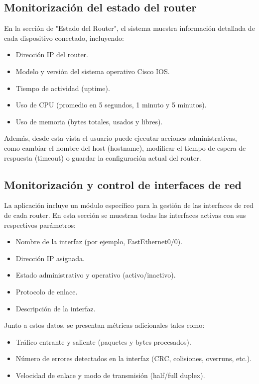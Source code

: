 \subsection*{Monitorización del estado del router}

En la sección de "Estado del Router", el sistema muestra información detallada de cada dispositivo conectado, incluyendo:

\begin{itemize}
    \item Dirección IP del router.
    \item Modelo y versión del sistema operativo Cisco IOS.
    \item Tiempo de actividad (uptime).
    \item Uso de CPU (promedio en 5 segundos, 1 minuto y 5 minutos).
    \item Uso de memoria (bytes totales, usados y libres).
\end{itemize}

Además, desde esta vista el usuario puede ejecutar acciones administrativas, como cambiar el nombre del host (hostname), modificar el tiempo de espera de respuesta (timeout) o guardar la configuración actual del router.

\subsection*{Monitorización y control de interfaces de red}

La aplicación incluye un módulo específico para la gestión de las interfaces de red de cada router. En esta sección se muestran todas las interfaces activas con sus respectivos parámetros:

\begin{itemize}
    \item Nombre de la interfaz (por ejemplo, FastEthernet0/0).
    \item Dirección IP asignada.
    \item Estado administrativo y operativo (activo/inactivo).
    \item Protocolo de enlace.
    \item Descripción de la interfaz.
\end{itemize}

Junto a estos datos, se presentan métricas adicionales tales como:

\begin{itemize}
    \item Tráfico entrante y saliente (paquetes y bytes procesados).
    \item Número de errores detectados en la interfaz (CRC, colisiones, overruns, etc.).
    \item Velocidad de enlace y modo de transmisión (half/full duplex).
\end{itemize}

